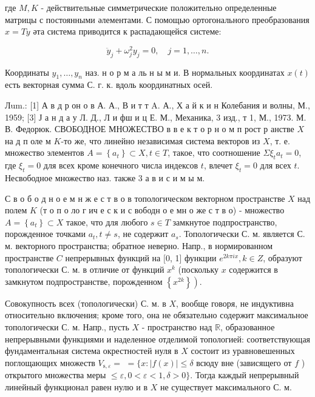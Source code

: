 \documentclass[10pt]{article}
\begin{document}
где $M, K$ - действительные симметрические положительно определенные матрицы с постоянными әлементами. С помощью ортогонального преобразования $x=T y$ әта система приводится к распадающейся системе:



\[

\ddot{y}_{j}+\omega_{j}^{2} y_{j}=0, \quad j=1, \ldots, n .

\]



Координаты $y_{1}, \ldots, y_{n}$ наз. н о р м а ль н ы м и. В нормальных координатах $x(t)$ есть векторная сумма С. г. к. вдоль координатных осей.



Лum.: [1] А в д р он о в А. А., В и т т A. А., Х а й к и н Колебания и волны, М., 1959; [3] Ј а н д а у Л. Д., Л и фш и ц Е. М., Механика, 3 изд., т 1, М., 1973. М. В. Федорюк. СВОБОДНОЕ МНОЖЕСТВО в в е к т о р н о м п рост р анстве $X$ на д п оле м $K$-то же, что линейно независимая система векторов из $X$, т. е. множество элементов $A=\left\{a_{t}\right\} \subset X, t \in T$, такое, что соотношение $\Sigma \xi_{t} a_{t}=0$, где $\xi_{t}=0$ для всех кроме конечного числа индексов $t$, влечет $\xi_{t}=0$ для всех $t$. Несвободное множество наз. также 3 а в и с и м ы м.



С в о б о д н о е м н ж е с т в о в топологическом векторном пространстве $X$ над полем $K$ (т о п о ло г ич е с к и с вободн о е мн о же с т в о) - множество $A=\left\{a_{t}\right\} \subset X$ такое, что для любого $s \in T$ замкнутое подпространство, порожденное точками $a_{t}, t \neq s$, не содержит $a_{s}$. Топологически С. м. является С. м. векторного пространства; обратное неверно. Напр., в нормированном пространстве $C$ непрерывных функций на $[0$, 1] функции $e^{2 k \pi i x}, k \in Z$, образуют топологически С. м. в отличие от функций $x^{k}$ (поскольку $x$ содержится в замкнутом подпространстве, порожденном $\left.\left\{x^{2 k}\right\}\right)$.



Совокупность всех (топологически) С. м. в $X$, вообще говоря, не индуктивна относительно включения; кроме того, она не обязательно содержит максимальное топологически С. м. Напр., пусть $X$ - пространство над $\mathbb{R}$, образованное непрерывными функциями и наделенное отделимой топологией: соответствующая фундаментальная система окрестностей нуля в $X$ состоит из уравновешенных поглощающих множеств $V_{\mathrm{s}, \varepsilon}=$ $=\{x:|f(x)| \leqslant \delta$ всюду вне (зависящего от $f$ ) открытого множества меры $\leqslant \varepsilon, 0<\varepsilon<1, \delta>0\}$. Тогда каждый непрерывный линейный функционал равен нулю и в $X$ не существует максимального С. м.
\end{document}
